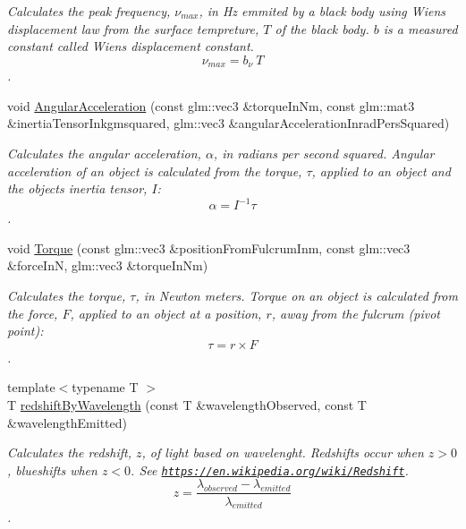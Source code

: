 \begin{DoxyCompactItemize}
\begin{DoxyCompactList}\small\item\em Calculates the peak frequency, $\nu_{max}$, in Hz emmited by a black body using Wien\textquotesingle{}s displacement law from the surface tempreture, $T$ of the black body. $b$ is a measured constant called Wien\textquotesingle{}s displacement constant. \[\nu_{max} = b_\nu\ T \]. \end{DoxyCompactList}\item 
void \mbox{\hyperlink{group___e_g_x_phys-_kinetics-_angular_acceleration_gaf636e9a30f3db4e170829efbf40efbbe}{Angular\+Acceleration}} (const glm\+::vec3 \&torque\+In\+Nm, const glm\+::mat3 \&inertia\+Tensor\+Inkgmsquared, glm\+::vec3 \&angular\+Acceleration\+Inrad\+Pers\+Squared)
\begin{DoxyCompactList}\small\item\em Calculates the angular acceleration, $\alpha$, in radians per second squared. Angular acceleration of an object is calculated from the torque, $\tau$, applied to an object and the object\textquotesingle{}s inertia tensor, $I$\+: \[\alpha=I^{-1} \tau \]. \end{DoxyCompactList}\item 
void \mbox{\hyperlink{group___e_g_x_phys-_kinetics-_torque_ga12a787853cab88d40412c8290ca41c61}{Torque}} (const glm\+::vec3 \&position\+From\+Fulcrum\+Inm, const glm\+::vec3 \&force\+InN, glm\+::vec3 \&torque\+In\+Nm)
\begin{DoxyCompactList}\small\item\em Calculates the torque, $\tau$, in Newton meters. Torque on an object is calculated from the force, $F$, applied to an object at a position, $r$, away from the fulcrum (pivot point)\+: \[\tau=r \times F \]. \end{DoxyCompactList}\item 
{\footnotesize template$<$typename T $>$ }\\T \mbox{\hyperlink{group___e_g_x_phys-_optics_ga29300a13e34da35332ca2d447b5ce82d}{redshift\+By\+Wavelength}} (const T \&wavelength\+Observed, const T \&wavelength\+Emitted)
\begin{DoxyCompactList}\small\item\em Calculates the redshift, $z$, of light based on wavelenght. Redshifts occur when $z > 0$, blueshifts when $z < 0$. See \href{https://en.wikipedia.org/wiki/Redshift}{\tt https\+://en.\+wikipedia.\+org/wiki/\+Redshift}. \[z=\frac{\lambda_{observed}-\lambda_{emitted}}{\lambda_{emitted}}\]. \end{DoxyCompactList}\item 

\end{DoxyCompactItemize}
